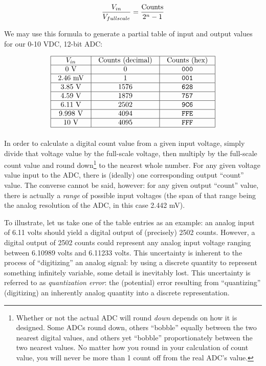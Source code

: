 $${V_{in} \over V_{fullscale}} = {\hbox{Counts} \over 2^n - 1}$$

We may use this formula to generate a partial table of input and output values for our 0-10 VDC, 12-bit ADC:


$$\vbox{\offinterlineskip
\halign{\strut
\vrule \quad\hfil # \ \hfil & 
\vrule \quad\hfil # \ \hfil & 
\vrule \quad\hfil # \ \hfil \vrule \cr
\noalign{\hrule}
%
$V_{in}$ & Counts (decimal) & Counts (hex) \cr
%
\noalign{\hrule}
%
0 V & 0 & \texttt{000} \cr
%
\noalign{\hrule}
%
2.46 mV & 1 & \texttt{001} \cr
%
\noalign{\hrule}
%
3.85 V & 1576 & \texttt{628} \cr
%
\noalign{\hrule}
%
4.59 V & 1879 & \texttt{757} \cr
%
\noalign{\hrule}
%
6.11 V & 2502 & \texttt{9C6} \cr
%
\noalign{\hrule}
%
9.998 V & 4094 & \texttt{FFE} \cr
%
\noalign{\hrule}
%
10 V & 4095 & \texttt{FFF} \cr
%
\noalign{\hrule}
} %
}$$ %

In order to calculate a digital count value from a given input voltage, simply divide that voltage value by the full-scale voltage, then multiply by the full-scale count value and round down\footnote{Whether or not the actual ADC will round \textit{down} depends on how it is designed.  Some ADCs round down, others ``bobble'' equally between the two nearest digital values, and others yet ``bobble'' proportionately between the two nearest values.  No matter how you round in your calculation of count value, you will never be more than 1 count off from the real ADC's value.} to the nearest whole number.  For any given voltage value input to the ADC, there is (ideally) one corresponding output ``count'' value.  The converse cannot be said, however: for any given output ``count'' value, there is actually a \textit{range} of possible input voltages (the span of that range being the analog resolution of the ADC, in this case 2.442 mV).

To illustrate, let us take one of the table entries as an example: an analog input of 6.11 volts should yield a digital output of (precisely) 2502 counts.  However, a digital output of 2502 counts could represent any analog input voltage ranging between 6.10989 volts and 6.11233 volts.  This uncertainty is inherent to the process of ``digitizing'' an analog signal: by using a discrete quantity to represent something infinitely variable, some detail is inevitably lost.  This uncertainty is referred to as \textit{quantization error}: the (potential) error resulting from ``quantizing'' (digitizing) an inherently analog quantity into a discrete representation.  

